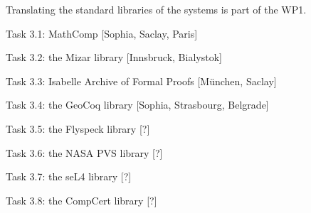 Translating the standard libraries of the systems is part of the WP1. 

Task 3.1: MathComp [Sophia, Saclay, Paris]

Task 3.2: the Mizar library [Innsbruck, Bialystok]

Task 3.3: Isabelle Archive of Formal Proofs [München, Saclay]

Task 3.4: the GeoCoq library [Sophia, Strasbourg, Belgrade]

Task 3.5: the Flyspeck library [?]

Task 3.6: the NASA PVS library [?]

Task 3.7: the seL4 library [?]

Task 3.8: the CompCert library [?]
